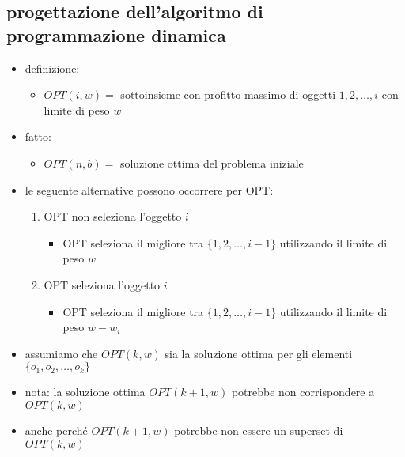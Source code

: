 
\subsection*{progettazione dell'algoritmo di programmazione dinamica}
\begin{flushleft}
	\begin{itemize}
		\item definizione:
		\begin{itemize}
			\item $OPT(i,w)=$ sottoinsieme con profitto massimo di oggetti $1,2,\ldots,i$ con limite di peso $w$
		\end{itemize}
		\item fatto:
		\begin{itemize}
			\item $OPT(n,b)=$ soluzione ottima del problema iniziale
		\end{itemize}
		\item le seguente alternative possono occorrere per OPT:
		\begin{enumerate}
			\item OPT non seleziona l'oggetto $i$
			\begin{itemize}
				\item OPT seleziona il migliore tra $\{1,2,\ldots,i-1\}$ utilizzando il limite di peso $w$
			\end{itemize}
			\item OPT seleziona l'oggetto $i$
			\begin{itemize}
				\item OPT seleziona il migliore tra $\{1,2,\ldots,i-1\}$ utilizzando il limite di peso $w-w_i$
			\end{itemize}
		\end{enumerate}
		\item assumiamo che $OPT(k,w)$ sia la soluzione ottima per gli elementi $\{o_1,o_2,\ldots,o_k\}$
		\item nota: la soluzione ottima $OPT(k+1,w)$ potrebbe non corrispondere a $OPT(k,w)$
		\item anche perch\'e $OPT(k+1,w)$ potrebbe non essere un superset di $OPT(k,w)$
	\end{itemize}
\end{flushleft}


